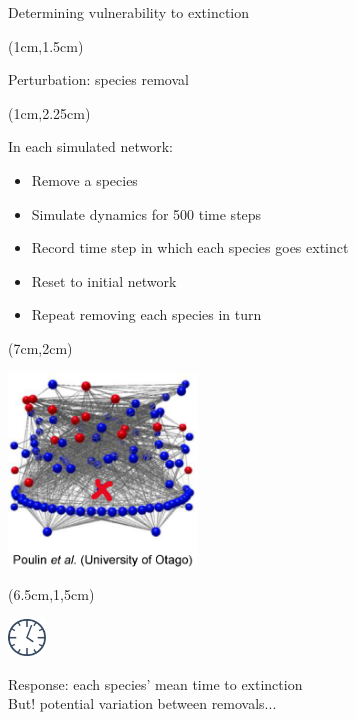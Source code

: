\documentclass{beamer}
\begin{document}
  \begin{frame}{Determining vulnerability to extinction}

    \begin{textblock*}{7cm}(1cm,1.5cm)

      {\color{DarkBlue}Perturbation: species removal}

    \end{textblock*}

    \begin{textblock*}{5cm}(1cm,2.25cm)

      {\color{DarkBlue}In each simulated network:}

      \begin{itemize}
        \item Remove a species
        \item Simulate dynamics for 500 time steps
        \item Record time step in which each species goes extinct
        \item Reset to initial network
        \item Repeat removing each species in turn

      \end{itemize}

      \end{textblock*}

    \begin{textblock*}{5cm}(7cm,2cm)

      \includegraphics[width=5cm]{intro_figs/Otagoweb_remove2.eps}

      \end{textblock*}

    \begin{textblock*}{1cm}(6.5cm,1,5cm)

      \includegraphics[width=1cm]{intro_figs/clock.eps}

      \end{textblock*}

    {\color{white} Response: each species' mean time to extinction\\
    But! potential variation between removals...}

    \end{frame}
\end{document}
